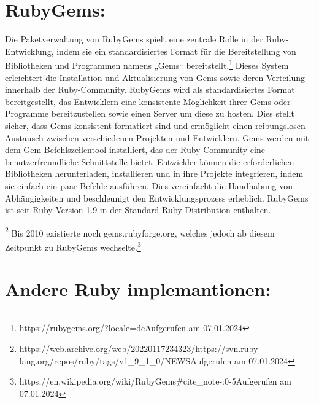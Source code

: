 \documentclass{article}
\begin{document}
\section*{RubyGems:}
Die Paketverwaltung von RubyGems  spielt eine zentrale Rolle in der Ruby-Entwicklung, indem sie ein standardisiertes Format für die Bereitstellung von Bibliotheken und Programmen namens „Gems“ bereitstellt.\footnote{https://rubygems.org/?locale=deAufgerufen am 07.01.2024}
 Dieses System erleichtert  die Installation und Aktualisierung von Gems sowie deren Verteilung innerhalb der Ruby-Community.
 RubyGems wird als  standardisiertes Format bereitgestellt, das Entwicklern eine konsistente Möglichkeit ihrer Gems oder Programme bereitzustellen sowie einen Server um diese zu hosten.
 Dies stellt sicher, dass Gems konsistent formatiert sind und ermöglicht einen reibungslosen Austausch zwischen verschiedenen Projekten und Entwicklern.
  Gems werden mit dem Gem-Befehlszeilentool installiert, das der Ruby-Community eine benutzerfreundliche Schnittstelle  bietet.
 Entwickler können  die erforderlichen Bibliotheken herunterladen, installieren und in ihre Projekte integrieren, indem sie einfach ein paar Befehle ausführen.
 Dies vereinfacht die Handhabung von Abhängigkeiten und beschleunigt den Entwicklungsprozess erheblich.
 RubyGems ist seit Ruby Version 1.9  in der Standard-Ruby-Distribution enthalten.

\footnote{https://web.archive.org/web/20220117234323/https://svn.ruby-lang.org/repos/ruby/tags/v1\_9\_1\_0/NEWSAufgerufen am 07.01.2024}
Bis 2010 existierte noch gems.rubyforge.org, welches jedoch ab diesem Zeitpunkt zu RubyGems wechselte.\footnote{https://en.wikipedia.org/wiki/RubyGems\#cite\_note-:0-5Aufgerufen am 07.01.2024}
\section*{Andere Ruby implemantionen:}
\end{document}
